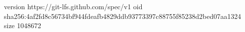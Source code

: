 version https://git-lfs.github.com/spec/v1
oid sha256:4af2fd8c56734bf944fdeafb4829ddb93773397c88755f85238d2bed07aa1324
size 1048672
